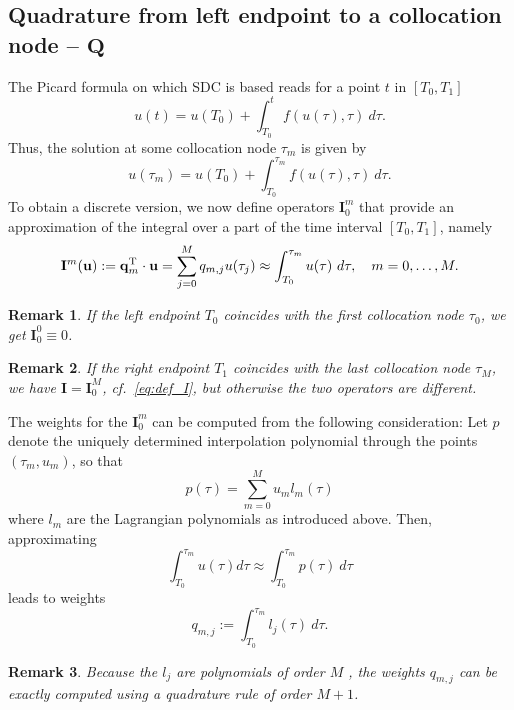 \documentclass[11pt]{article}
\newcommand{\Tt}[1]{\mathbf{#1}}
\newtheorem{remark}{Remark}
\begin{document}
\subsection{Quadrature from left endpoint to a collocation node -- $\Tt{Q}$}
The Picard formula on which SDC is based reads for a point $t$ in $[T_0, T_1]$
\begin{equation}
	u(t) = u(T_0) + \int_{T_0}^{t} f(u(\tau), \tau) \ d\tau.
\end{equation}
Thus, the solution at some collocation node $\tau_m$ is given by
\begin{equation}
	u(\tau_m) = u(T_0) + \int_{T_0}^{\tau_m} f(u(\tau), \tau) \ d\tau.
\end{equation}
To obtain a discrete version, we now define operators $\Tt{I}_{0}^{m}$ that provide an approximation of the integral over a part of the time interval $[T_0, T_1]$, namely
\begin{equation}
	\Tt{I}^{m}(\Tt{u}) := \Tt{q}_{m}^{\rm T} \cdot \Tt{u} = \sum_{j=0}^{M} q_{m, j} u(\tau_{j}) \approx \int_{T_0}^{\tau_{m}} u(\tau) \ d\tau, \quad m=0,\ldots,M.
\end{equation}
\begin{remark}
If the left endpoint $T_0$ coincides with the first collocation node $\tau_0$, we get $\Tt{I}_{0}^{0} \equiv 0$.
\end{remark}
\begin{remark}
If the right endpoint $T_1$ coincides with the last collocation node $\tau_{M}$, we have $\Tt{I} = \Tt{I}_{0}^{M}$, cf.~\eqref{eq:def_I}, but otherwise the two operators are different.
\end{remark}
The weights for the $\Tt{I}_{0}^{m}$ can be computed from the following consideration: Let $p$ denote the uniquely determined interpolation polynomial through the points $(\tau_m, u_m)$, so that
\begin{equation}
	p(\tau) = \sum_{m=0}^{M} u_m l_m(\tau)
\end{equation}
where $l_m$ are the Lagrangian polynomials as introduced above. Then, approximating
\begin{equation}
	\int_{T_0}^{\tau_m} u(\tau) d\tau \approx \int_{T_0}^{\tau_m} p(\tau) \ d\tau
\end{equation}
leads to weights
\begin{equation}
	\label{eq:def_q}
	q_{m,j} := \int_{T_0}^{\tau_m} l_j(\tau) \ d\tau.
\end{equation}
\begin{remark}
Because the $l_j$ are polynomials of order $M$ , the weights $q_{m,j}$ can be exactly computed using a quadrature rule of order $M+1$. 
\end{remark}
\end{document}
